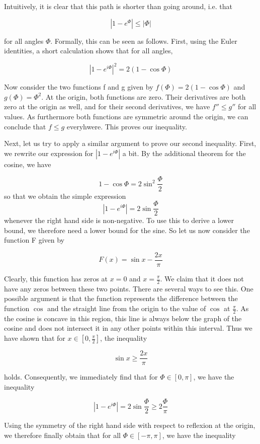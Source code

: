 \documentclass[a4paper, draft]{article}
\theoremstyle{own}
\theoremstyle{remark}
\begin{document}
Intuitively, it is clear that this path is shorter than going around, i.e. that 

$$
| 1 - e^{\Phi} | \leq |\Phi|
$$

for all angles $\Phi$. Formally, this can be seen as follows. First, using the Euler identities, a short calculation shows that for all angles,

$$
|1 - e^{i\Phi}|^2 = 2(1 - \cos \Phi)
$$

Now consider the two functions f and g given by $f(\Phi) = 2(1 - \cos \Phi)$ and $g(\Phi)  = \Phi^2$. At the origin, both functions are zero. Their derivatives are both zero at the origin as well, and for their second derivatives, we have $f'' \leq g''$ for all values. As furthermore both functions are symmetric around the origin, we can conclude that $f \leq g$ everyhwere. This proves our inequality.

Next, let us try to apply a similar argument to prove our second inequality. First, we rewrite our expression for $|1 - e^{i\Phi}|$ a bit. By the additional theorem for the cosine, we have

$$
1 - \cos \Phi = 2 \sin^2 \frac{\Phi}{2}
$$
so that we obtain the simple expression
$$
| 1- e^{i\Phi}| = 2 \sin \frac{\Phi}{2}
$$
whenever the right hand side is non-negative. To use this to derive a lower bound, we therefore need a lower bound for the sine. So let us now consider the function F given by

$$
F(x) = \sin x - \frac{2x}{\pi}
$$

Clearly, this function has zeros at $x = 0$ and $x = \frac{\pi}{2}$. We claim that it does not have any zeros between these two points. There are several ways to see this. One possible argument is that the function represents the difference between the function $\cos $ and the straight line from the origin to the value of $\cos$ at $\frac{\pi}{2}$. As the cosine is concave in this region, this line is always below the graph of the cosine and does not intersect it in any other points within this interval. Thus we have shown that for $x \in [0,\frac{\pi}{2}]$, the inequality

$$
\sin x \geq \frac{2x}{\pi}
$$

holds. Consequently, we immediately find that for $\Phi \in [0,\pi]$, we have the inequality

$$
| 1- e^{i\Phi}| = 2 \sin \frac{\Phi}{2}  \geq 2 \frac{\Phi}{\pi}
$$

Using the symmetry of the right hand side with respect to reflexion at the origin, we therefore finally obtain that for all $\Phi \in [-\pi, \pi]$, we have the inequality
\end{document}
